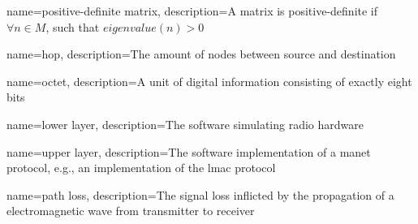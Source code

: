 {name={positive-definite matrix}, description={A matrix is positive-definite if $\forall n \in M$, such that
    $eigenvalue(n) > 0$~\cite{website:positive-definite-wolfram}}}

{name={hop}, description={The amount of nodes between source and destination}}

{name={octet}, description={A unit of digital information consisting of exactly eight bits}}

{name={lower layer}, description={The software simulating radio hardware}}

{name={upper layer}, description={The software implementation of a \acrshort{manet} protocol, e.g., an
    implementation of the \acrshort{lmac} protocol}}

{name={path loss}, description={The signal loss inflicted by the propagation of a electromagnetic wave from
    transmitter to receiver~\cite[p.~10]{paper:linkmodel}}}